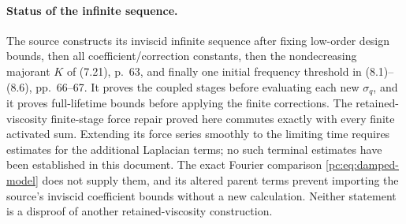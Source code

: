 \paragraph{Status of the infinite sequence.}
The source constructs its inviscid infinite sequence after fixing low-order design bounds, then all coefficient/correction constants, then the nondecreasing majorant $K$ of (7.21), p.~63, and finally one initial frequency threshold in (8.1)--(8.6), pp.~66--67. It proves the coupled stages before evaluating each new $\sigma_q$, and it proves full-lifetime bounds before applying the finite corrections. The retained-viscosity finite-stage force repair proved here commutes exactly with every finite activated sum. Extending its force series smoothly to the limiting time requires estimates for the additional Laplacian terms; no such terminal estimates have been established in this document. The exact Fourier comparison \eqref{pc:eq:damped-model} does not supply them, and its altered parent terms prevent importing the source's inviscid coefficient bounds without a new calculation. Neither statement is a disproof of another retained-viscosity construction.
